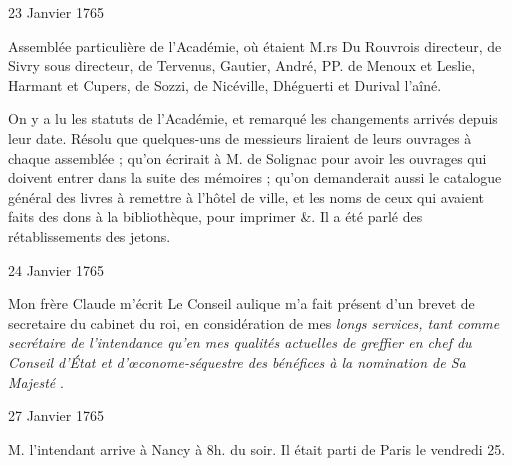                      \begin{diary}{23 Janvier 1765}{}


                           Assemblée particulière de l'Académie, où
                           étaient
                           M.rs Du Rouvrois directeur,
                              de Sivry
                           sous directeur,
                           de Tervenus, Gautier, André, PP. de Menoux et
                              Leslie,
                           Harmant et Cupers, de
                              Sozzi, de Nicéville,
                              Dhéguerti
                           et Durival l'aîné. \bigskip


                         On y a lu les statuts de l'Académie, et remarqué
                           les changements arrivés depuis leur date. Résolu
                           que quelques-uns de messieurs liraient de leurs ouvrages
                           à chaque assemblée ; qu'on écrirait à M. de Solignac
                           pour avoir les ouvrages qui doivent entrer dans
                           la suite des mémoires ; qu'on demanderait aussi le
                           catalogue général des livres à remettre à l'hôtel
                              de ville, et les noms de ceux qui avaient faits
                           des dons à la bibliothèque, pour imprimer \&.
                           Il a été parlé des rétablissements des jetons.
                        \bigskip


                     \end{diary}

                     \begin{diary}{24 Janvier 1765}{}


                           Mon frère Claude m'écrit
                                 \og Le Conseil aulique
                              m'a fait présent d'un brevet de secretaire du
                              cabinet du roi, en considération de mes \emph{longs
                                 services, tant comme secrétaire de l'intendance
                                 qu'en mes qualités actuelles de greffier en chef du Conseil d’État et
                                    d'œconome-séquestre
                                 des
                                 bénéfices à la nomination de Sa Majesté}
                            \fg{}. \bigskip


                     \end{diary}
                     \begin{diary}{27 Janvier 1765}{}


                           M. l'intendant arrive à
                              Nancy à 8h. du
                           soir. Il était parti de Paris
                           le vendredi 25. \bigskip


                     \end{diary}

